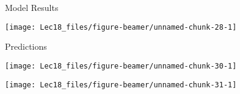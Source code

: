 \documentclass[11pt,ignorenonframetext,]{beamer}
\newenvironment{Shaded}{}{}
\newcommand{\DataTypeTok}[1]{\textcolor[rgb]{0.56,0.13,0.00}{#1}}
\newcommand{\DecValTok}[1]{\textcolor[rgb]{0.25,0.63,0.44}{#1}}
\newcommand{\KeywordTok}[1]{\textcolor[rgb]{0.00,0.44,0.13}{\textbf{#1}}}
\newcommand{\NormalTok}[1]{#1}
\newcommand{\OperatorTok}[1]{\textcolor[rgb]{0.40,0.40,0.40}{#1}}
\newcommand{\StringTok}[1]{\textcolor[rgb]{0.25,0.44,0.63}{#1}}
\def\endcol{\end{column}}
\def\endcols{\end{columns}}
\let\oldShaded\Shaded
\let\endoldShaded\endShaded
\renewenvironment{Shaded}{\footnotesize\begin{spacing}{0.9}\oldShaded}{\endoldShaded\end{spacing}}
\begin{document}

\begin{frame}{Model Results}
\protect\hypertarget{model-results-1}{}

\begin{center}\texttt{[image: Lec18\_files/figure-beamer/unnamed-chunk-28-1]} \end{center}

\end{frame}

\begin{frame}[t]{Predictions}
\protect\hypertarget{predictions-2}{}

\begin{center}\texttt{[image: Lec18\_files/figure-beamer/unnamed-chunk-30-1]} \end{center}

\end{frame}

\begin{frame}{}
\protect\hypertarget{section-4}{}

\begin{center}\texttt{[image: Lec18\_files/figure-beamer/unnamed-chunk-31-1]} \end{center}

\end{frame}
\end{document}
